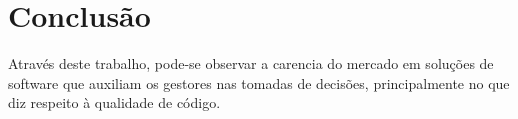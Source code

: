 \chapter[Conclusão]{Conclusão}
\label{sec:conclusão}

Através deste trabalho, pode-se observar a carencia do mercado em soluções de software que auxiliam os gestores nas tomadas de decisões, principalmente no que diz respeito à qualidade de código.